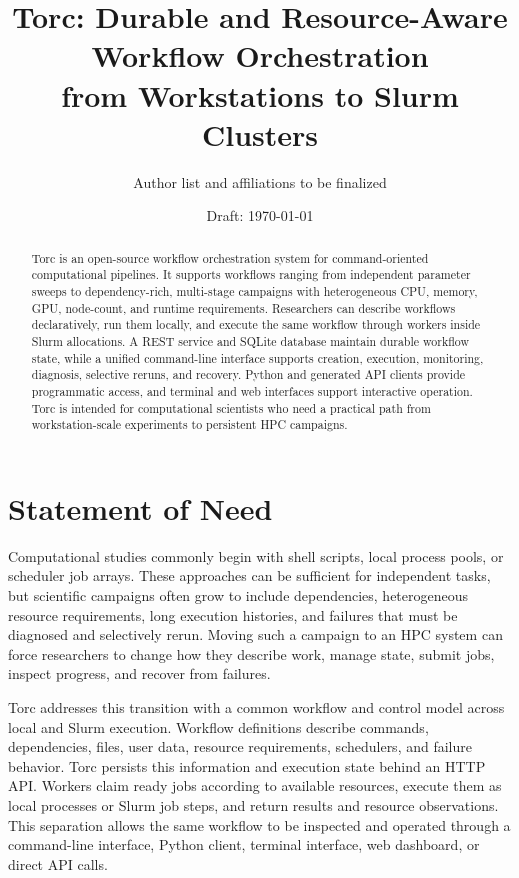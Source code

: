 \documentclass[11pt]{article}
\title{Torc: Durable and Resource-Aware Workflow Orchestration\\
  from Workstations to Slurm Clusters}
\author{Author list and affiliations to be finalized}
\date{Draft: \today}
\begin{document}
\maketitle

\begin{abstract}
Torc is an open-source workflow orchestration system for command-oriented computational pipelines.
It supports workflows ranging from independent parameter sweeps to dependency-rich, multi-stage
campaigns with heterogeneous CPU, memory, GPU, node-count, and runtime requirements. Researchers can
describe workflows declaratively, run them locally, and execute the same workflow through workers
inside Slurm allocations. A REST service and SQLite database maintain durable workflow state, while
a unified command-line interface supports creation, execution, monitoring, diagnosis, selective
reruns, and recovery. Python and generated API clients provide programmatic access, and terminal and
web interfaces support interactive operation. Torc is intended for computational scientists who
need a practical path from workstation-scale experiments to persistent HPC campaigns.
\end{abstract}

\section{Statement of Need}

Computational studies commonly begin with shell scripts, local process pools, or scheduler job
arrays. These approaches can be sufficient for independent tasks, but scientific campaigns often
grow to include dependencies, heterogeneous resource requirements, long execution histories, and
failures that must be diagnosed and selectively rerun. Moving such a campaign to an HPC system can
force researchers to change how they describe work, manage state, submit jobs, inspect progress, and
recover from failures.

Torc addresses this transition with a common workflow and control model across local and Slurm
execution. Workflow definitions describe commands, dependencies, files, user data, resource
requirements, schedulers, and failure behavior. Torc persists this information and execution state
behind an HTTP API. Workers claim ready jobs according to available resources, execute them as local
processes or Slurm job steps, and return results and resource observations. This separation allows
the same workflow to be inspected and operated through a command-line interface, Python client,
terminal interface, web dashboard, or direct API calls.
\end{document}

